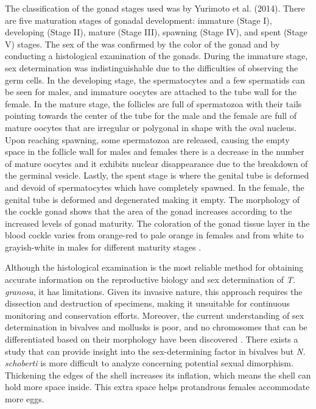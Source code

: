 The classification of the gonad stages used was by Yurimoto et al. (2014). There are five maturation stages of gonadal development: immature (Stage I), developing (Stage II), mature (Stage III), spawning (Stage IV), and spent (Stage V) stages. The sex of the \Tgranosa was confirmed by the color of the gonad and by conducting a histological examination of the gonads. During the immature stage, sex determination was indistinguishable due to the difficulties of observing the germ cells. In the developing stage, the spermatocytes and a few spermatids can be seen for males, and immature oocytes are attached to the tube wall for the female. In the mature stage, the follicles are full of spermatozoa with their tails pointing towards the center of the tube for the male and the female are full of mature oocytes that are irregular or polygonal in shape with the oval nucleus. Upon reaching spawning, some spermatozoa are released, causing the empty space in the follicle wall for males and females there is a decrease in the number of mature oocytes and it exhibits nuclear disappearance due to the breakdown of the germinal vesicle. Lastly, the spent stage is where the genital tube is deformed and devoid of spermatocytes which have completely spawned. In the female, the genital tube is deformed and degenerated making it empty. The morphology of the cockle gonad shows that the area of the gonad increases according to the increased levels of gonad maturity. The coloration of the gonad tissue layer in the blood cockle varies from orange-red to pale orange in females and from white to grayish-white in males for different maturity stages \cite{may2021}. 

Although the histological examination is the most reliable method for obtaining accurate information on the reproductive biology and sex determination of \textit{T. granosa}, it has limitations. Given its invasive nature, this approach requires the dissection and destruction of specimens, making it unsuitable for continuous monitoring and conservation efforts. Moreover, the current understanding of sex determination in bivalves and mollusks is poor, and no chromosomes that can be differentiated based on their morphology have been discovered \cite{afiati2007}. There exists a study that can provide insight into the sex-determining factor in bivalves but  \textit{N. schoberti} is more difficult to analyze concerning potential sexual dimorphism. Thickening the edges of the shell increases its inflation, which means the shell can hold more space inside. This extra space helps protandrous females accommodate more eggs.

